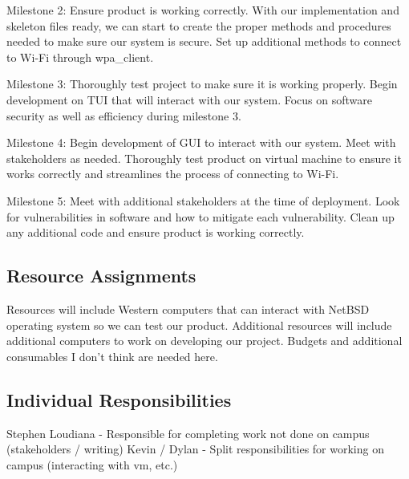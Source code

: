 Milestone 2: Ensure product is working correctly. With our implementation and skeleton files ready, we can start to create the proper methods and procedures 
needed to make sure our system is secure. Set up additional methods to connect to Wi-Fi through wpa\_client. 

Milestone 3: Thoroughly test project to make sure it is working properly. Begin development on TUI that will interact with our system. Focus on software security 
as well as efficiency during milestone 3. 

Milestone 4: Begin development of GUI to interact with our system. Meet with stakeholders as needed. Thoroughly test product on virtual machine to ensure it works 
correctly and streamlines the process of connecting to Wi-Fi. 

Milestone 5: Meet with additional stakeholders at the time of deployment. Look for vulnerabilities in software and how to mitigate each vulnerability. Clean up any 
additional code and ensure product is working correctly. 


\subsection{Resource Assignments}
%

Resources will include Western computers that can interact with NetBSD operating system so we can test our product. Additional resources will include 
additional computers to work on developing our project. Budgets and additional consumables I don’t think are needed here. 


\subsection{Individual Responsibilities}
%
Stephen Loudiana - Responsible for completing work not done on campus (stakeholders / writing)
Kevin / Dylan - Split responsibilities for working on campus (interacting with vm, etc.) 

